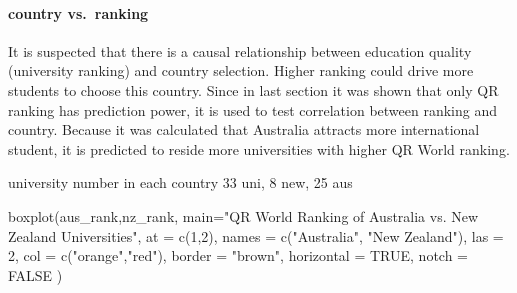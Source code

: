 \documentclass[
]{article}
\newenvironment{Shaded}{\begin{snugshade}}{\end{snugshade}}
\newcommand{\AttributeTok}[1]{\textcolor[rgb]{0.77,0.63,0.00}{#1}}
\newcommand{\ConstantTok}[1]{\textcolor[rgb]{0.00,0.00,0.00}{#1}}
\newcommand{\DecValTok}[1]{\textcolor[rgb]{0.00,0.00,0.81}{#1}}
\newcommand{\FunctionTok}[1]{\textcolor[rgb]{0.00,0.00,0.00}{#1}}
\newcommand{\NormalTok}[1]{#1}
\newcommand{\OtherTok}[1]{\textcolor[rgb]{0.56,0.35,0.01}{#1}}
\newcommand{\SpecialCharTok}[1]{\textcolor[rgb]{0.00,0.00,0.00}{#1}}
\newcommand{\StringTok}[1]{\textcolor[rgb]{0.31,0.60,0.02}{#1}}
\begin{document}
\hypertarget{country-vs.-ranking}{%
\paragraph{country vs.~ranking}\label{country-vs.-ranking}}

It is suspected that there is a causal relationship between education
quality (university ranking) and country selection. Higher ranking could
drive more students to choose this country. Since in last section it was
shown that only QR ranking has prediction power, it is used to test
correlation between ranking and country. Because it was calculated that
Australia attracts more international student, it is predicted to reside
more universities with higher QR World ranking.

university number in each country 33 uni, 8 new, 25 aus

\begin{Shaded}
\end{Shaded}

\begin{Shaded}
\begin{Highlighting}[]
\FunctionTok{boxplot}\NormalTok{(aus\_rank,nz\_rank,}
        \AttributeTok{main=}\StringTok{"QR World Ranking of Australia vs. New Zealand Universities"}\NormalTok{,}
        \AttributeTok{at =} \FunctionTok{c}\NormalTok{(}\DecValTok{1}\NormalTok{,}\DecValTok{2}\NormalTok{),}
        \AttributeTok{names =} \FunctionTok{c}\NormalTok{(}\StringTok{"Australia"}\NormalTok{, }\StringTok{"New }
\StringTok{                  Zealand"}\NormalTok{),}
        \AttributeTok{las =} \DecValTok{2}\NormalTok{,}
        \AttributeTok{col =} \FunctionTok{c}\NormalTok{(}\StringTok{"orange"}\NormalTok{,}\StringTok{"red"}\NormalTok{),}
        \AttributeTok{border =} \StringTok{"brown"}\NormalTok{,}
        \AttributeTok{horizontal =} \ConstantTok{TRUE}\NormalTok{,}
        \AttributeTok{notch =} \ConstantTok{FALSE}
\NormalTok{)}
\end{Highlighting}
\end{Shaded}
\end{document}
